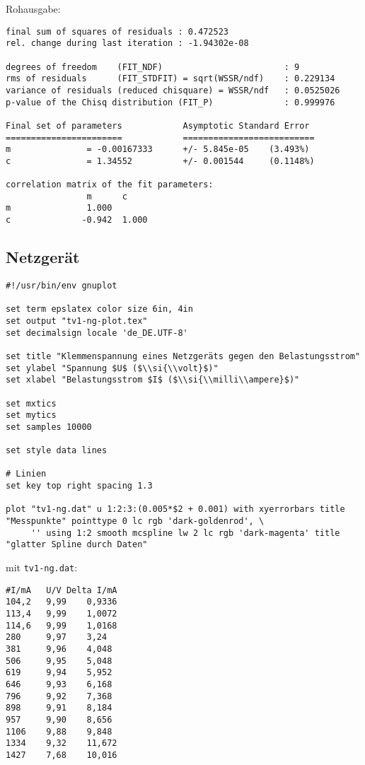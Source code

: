     Rohausgabe:
    \begin{verbatim}
final sum of squares of residuals : 0.472523
rel. change during last iteration : -1.94302e-08

degrees of freedom    (FIT_NDF)                        : 9
rms of residuals      (FIT_STDFIT) = sqrt(WSSR/ndf)    : 0.229134
variance of residuals (reduced chisquare) = WSSR/ndf   : 0.0525026
p-value of the Chisq distribution (FIT_P)              : 0.999976

Final set of parameters            Asymptotic Standard Error
=======================            ==========================
m               = -0.00167333      +/- 5.845e-05    (3.493%)
c               = 1.34552          +/- 0.001544     (0.1148%)

correlation matrix of the fit parameters:
                m      c      
m               1.000 
c              -0.942  1.000
    \end{verbatim}

    \subsection{Netzgerät}
    {  
        \renewcommand{\fcolorbox}[4][]{#4}
        \begin{verbatim}
#!/usr/bin/env gnuplot

set term epslatex color size 6in, 4in
set output "tv1-ng-plot.tex"
set decimalsign locale 'de_DE.UTF-8'

set title "Klemmenspannung eines Netzgeräts gegen den Belastungsstrom"
set ylabel "Spannung $U$ ($\\si{\\volt}$)"
set xlabel "Belastungsstrom $I$ ($\\si{\\milli\\ampere}$)"

set mxtics
set mytics
set samples 10000

set style data lines

# Linien
set key top right spacing 1.3

plot "tv1-ng.dat" u 1:2:3:(0.005*$2 + 0.001) with xyerrorbars title "Messpunkte" pointtype 0 lc rgb 'dark-goldenrod', \
     '' using 1:2 smooth mcspline lw 2 lc rgb 'dark-magenta' title "glatter Spline durch Daten"
        \end{verbatim}
    }
    mit \texttt{tv1-ng.dat}:
    \begin{multicols}{2}
        \begin{verbatim}
#I/mA   U/V Delta I/mA
104,2   9,99    0,9336
113,4   9,99    1,0072
114,6   9,99    1,0168
280     9,97    3,24
381     9,96    4,048
506     9,95    5,048
619     9,94    5,952
646     9,93    6,168
796     9,92    7,368
898     9,91    8,184
957     9,90    8,656
1106    9,88    9,848
1334    9,32    11,672
1427    7,68    10,016
        \end{verbatim}
    \end{multicols}
